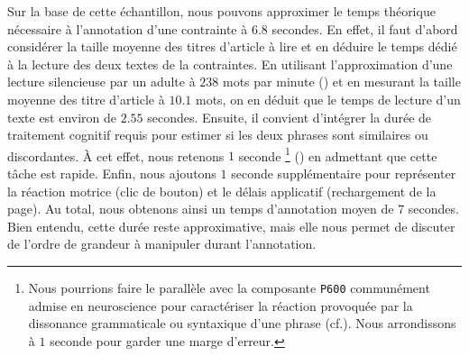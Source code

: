 			Sur la base de cette échantillon, nous pouvons approximer le temps théorique nécessaire à l'annotation d'une contrainte à $6.8$ secondes.
			En effet, il faut d'abord considérer la taille moyenne des titres d'article à lire et en déduire le temps dédié à la lecture des deux textes de la contraintes.
			En utilisant l'approximation d'une lecture silencieuse par un adulte à $238$ mots par minute (\cite{brysbaert:2019:how-many-words}) et en mesurant la taille moyenne des titre d'article à $10.1$ mots, on en déduit que le temps de lecture d'un texte est environ de $2.55$ secondes.
			Ensuite, il convient d'intégrer la durée de traitement cognitif requis pour estimer si les deux phrases sont similaires ou discordantes.
			À cet effet, nous retenons $1$ seconde
			\footnote{Nous pourrions faire le parallèle avec la composante \texttt{P600} communément admise en neuroscience pour caractériser la réaction provoquée par la dissonance grammaticale ou syntaxique d'une phrase (cf.). Nous arrondissons à $1$ seconde pour garder une marge d'erreur.
			} (\cite{purves-brannon:2013:principles-cognitive-neuroscience})
			en admettant que cette tâche est rapide.
			Enfin, nous ajoutons $1$ seconde supplémentaire pour représenter la réaction motrice (clic de bouton) et le délais applicatif (rechargement de la page).
			Au total, nous obtenons ainsi un temps d'annotation moyen de $7$ secondes.
			Bien entendu, cette durée reste approximative, mais elle nous permet de discuter de l'ordre de grandeur à manipuler durant l'annotation.
			
